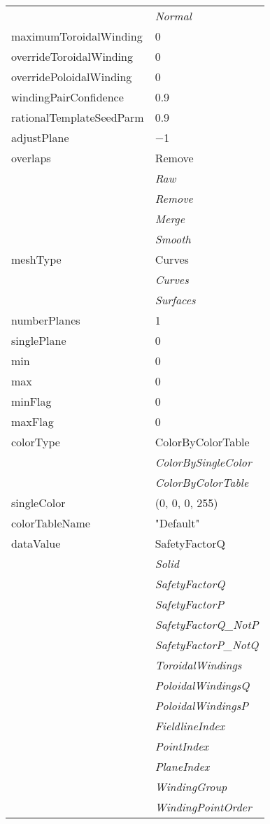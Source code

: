 \documentclass[10pt,a4paper]{report}
\begin{document}
\begin{longtable}{ll}
 & {\it  Normal} \\
maximumToroidalWinding  &  0 \\
overrideToroidalWinding  &  0 \\
overridePoloidalWinding  &  0 \\
windingPairConfidence  &  0.9 \\
rationalTemplateSeedParm  &  0.9 \\
adjustPlane  &  $-$1 \\
overlaps  &  Remove   \\
 & {\it  Raw} \\
 & {\it  Remove} \\
 & {\it  Merge} \\
 & {\it  Smooth} \\
meshType  &  Curves   \\
 & {\it  Curves} \\
 & {\it  Surfaces} \\
numberPlanes  &  1 \\
singlePlane  &  0 \\
min  &  0 \\
max  &  0 \\
minFlag  &  0 \\
maxFlag  &  0 \\
colorType  &  ColorByColorTable   \\
 & {\it  ColorBySingleColor} \\
 & {\it  ColorByColorTable} \\
singleColor  &  (0, 0, 0, 255) \\
colorTableName  &  "Default" \\
dataValue  &  SafetyFactorQ   \\
 & {\it  Solid} \\
 & {\it  SafetyFactorQ} \\
 & {\it  SafetyFactorP} \\
 & {\it  SafetyFactorQ\_NotP} \\
 & {\it  SafetyFactorP\_NotQ} \\
 & {\it  ToroidalWindings} \\
 & {\it  PoloidalWindingsQ} \\
 & {\it  PoloidalWindingsP} \\
 & {\it  FieldlineIndex} \\
 & {\it  PointIndex} \\
 & {\it  PlaneIndex} \\
 & {\it  WindingGroup} \\
 & {\it  WindingPointOrder} \\

\end{longtable}
\end{document}
